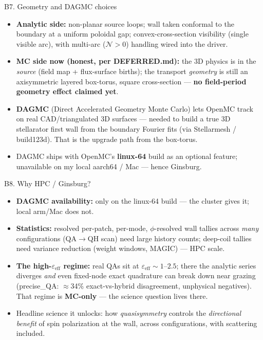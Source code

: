 \documentclass[aspectratio=169]{beamer}
\newcommand{\eps}{\varepsilon}
\begin{document}
\begin{frame}{B7. Geometry and DAGMC choices}
  \small
  \begin{itemize}
    \item \textbf{Analytic side:} non-planar source loops; wall taken conformal to the boundary at a
      uniform poloidal gap; convex-cross-section visibility (single visible arc), with multi-arc
      ($\mathcal{N}>0$) handling wired into the driver.
    \item \textbf{MC side now (honest, per DEFERRED.md):} the 3D physics is in the \emph{source}
      (field map + flux-surface births); the transport \emph{geometry} is still an axisymmetric
      layered box-torus, square cross-section --- \textbf{no field-period geometry effect claimed yet}.
    \item \textbf{DAGMC} (Direct Accelerated Geometry Monte Carlo) lets OpenMC track on real
      CAD/triangulated 3D surfaces --- needed to build a true 3D stellarator first wall from the
      boundary Fourier fits (via Stellarmesh / build123d). That is the upgrade path from the box-torus.
    \item DAGMC ships with OpenMC's \textbf{linux-64} build as an optional feature; unavailable on my
      local aarch64 / Mac --- hence Ginsburg.
  \end{itemize}
\end{frame}

\begin{frame}{B8. Why HPC / Ginsburg?}
  \small
  \begin{itemize}
    \item \textbf{DAGMC availability:} only on the linux-64 build --- the cluster gives it; local
      arm/Mac does not.
    \item \textbf{Statistics:} resolved per-patch, per-mode, $\phi$-resolved wall tallies across
      \emph{many} configurations (QA$\to$QH scan) need large history counts; deep-coil tallies need
      variance reduction (weight windows, MAGIC) --- HPC scale.
    \item \textbf{The high-$\eps_{\mathrm{eff}}$ regime:} real QAs sit at $\eps_{\mathrm{eff}}\sim1$--$2.5$;
      there the analytic series diverges \emph{and} even fixed-node exact quadrature can break down
      near grazing (precise\_QA: $\approx$34\% exact-vs-hybrid disagreement, unphysical negatives).
      That regime is \textbf{MC-only} --- the science question lives there.
    \item Headline science it unlocks: how \emph{quasisymmetry} controls the \emph{directional
      benefit} of spin polarization at the wall, across configurations, with scattering included.
  \end{itemize}
\end{frame}
\end{document}
